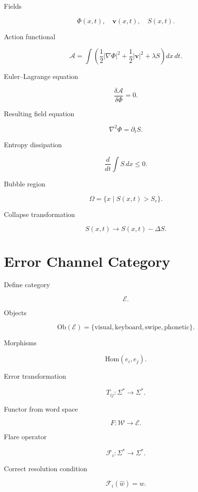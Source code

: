 \documentclass[11pt]{article}
\begin{document}
Fields

\[
\Phi(x,t), \quad
\mathbf{v}(x,t), \quad
S(x,t).
\]

Action functional

\[
\mathcal{A}
=
\int
\left(
\frac{1}{2}|\nabla\Phi|^2
+
\frac{1}{2}|\mathbf{v}|^2
+
\lambda S
\right)
dx\,dt.
\]

Euler–Lagrange equation

\[
\frac{\delta \mathcal{A}}{\delta \Phi} = 0.
\]

Resulting field equation

\[
\nabla^2 \Phi
=
\partial_t S.
\]

Entropy dissipation

\[
\frac{d}{dt}
\int S\,dx
\le 0.
\]

Bubble region

\[
\Omega
=
\{x \mid S(x,t) > S_c\}.
\]

Collapse transformation

\[
S(x,t)
\rightarrow
S(x,t) - \Delta S.
\]


\section{Error Channel Category}

Define category

\[
\mathcal{E}.
\]

Objects

\[
\text{Ob}(\mathcal{E})
=
\{\text{visual},\text{keyboard},\text{swipe},\text{phonetic}\}.
\]

Morphisms

\[
\text{Hom}(e_i,e_j).
\]

Error transformation

\[
T_{ij} :
\Sigma^* \rightarrow \Sigma^*.
\]

Functor from word space

\[
F :
\mathcal{W}
\rightarrow
\mathcal{E}.
\]

Flare operator

\[
\mathcal{F}_i :
\Sigma^* \rightarrow \Sigma^*.
\]

Correct resolution condition

\[
\mathcal{F}_i(\hat{w}) = w.
\]

\end{document}
